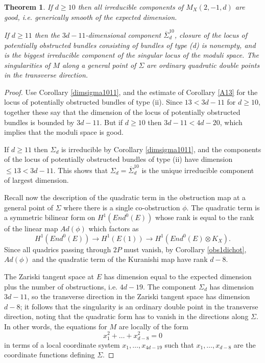 \documentclass{amsart}
\theoremstyle{plain}
\newtheorem{theorem}{Theorem}[section]
\numberwithin{equation}{section}
\begin{document}
\begin{theorem}
\label{goodness}
If $d\geq 10$ then all irreducible components of $M _X(2,-1,d)$ are good, i.e. generically smooth of the expected
dimension. 

If $d\geq 11$ then the $3d-11$-dimensional 
component $\overline{\Sigma}_d^{10}$, closure of the locus of potentially obstructed
bundles consisting of bundles of type (d) is nonempty, and is the biggest irreducible component of the singular locus of the  
moduli space. 
The singularities of $M$ along a general point of $\Sigma$ are ordinary quadratic
double points in the transverse direction. 
\end{theorem}
\begin{proof}
Use Corollary \ref{dimsigma1011}, and the estimate 
of Corollary \ref{A13} for the locus of potentially obstructed bundles of type (ii).
Since $13< 3d-11$ for $d\geq 10$, together these say that the dimension of the locus of potentially obstructed bundles is bounded by $3d-11$. 
But if $d\geq 10$ then $3d-11 <  4d-20$, which implies that the moduli space is good. 

If $d\geq 11$ then $\Sigma _d$ is irreducible by Corollary \ref{dimsigma1011},
and the components of the locus of potentially obstructed bundles of type (ii) have 
dimension $\leq 13 < 3d-11$.
This shows that $\Sigma_d=\overline{\Sigma} ^{10}_d$ is the unique 
irreducible component of largest dimension.

Recall now the description of the quadratic term in the obstruction map at a general
point of $\Sigma$ where there is a single co-obstruction $\phi$. The quadratic term is
a symmetric bilinear form on $H^1(End ^0(E))$ whose rank is equal to the
rank of the linear map $Ad(\phi )$ which factors as
$$
H^1(End ^0(E)) \rightarrow H^1(E(1))\rightarrow H^1(End ^0(E)\otimes K_X).
$$
Since all quadrics passing through $2P$ must vanish, by Corollary \ref{obs1dichot}, 
$Ad(\phi )$
and the quadratic term of the Kuranishi map
have rank $d-8$. 

The Zariski tangent space at $E$ has dimension equal to the expected dimension
plus the number of obstructions, i.e. $4d-19$. The component $\Sigma_d$
has dimension $3d-11$, so the transverse direction in the Zariski tangent space
has dimension $d-8$; it follows that the singularity is an ordinary double point
in the transverse direction, noting that the quadratic form has to vanish
in the directions along $\Sigma$. In other words, the equations for
$M$ are locally of the form
$$
x_1^2+\ldots + x_{d-8}^2=0
$$
in terms of a local coordinate system 
$x_1,\ldots , x_{4d-19}$ such that $x_1,\ldots , x_{d-8}$ are the coordinate functions defining $\Sigma$. 
\end{proof}
\end{document}
